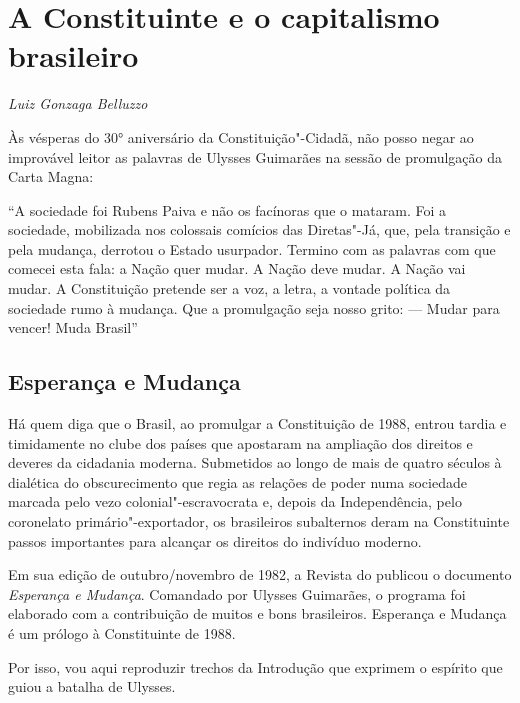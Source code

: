 \chapter*{A Constituinte e o capitalismo brasileiro}


\begin{flushright}
\emph{Luiz Gonzaga Belluzzo}
\end{flushright}

Às vésperas do 30° aniversário da Constituição"-Cidadã, não posso negar
ao improvável leitor as palavras de Ulysses Guimarães na sessão de
promulgação da Carta Magna:

``A sociedade foi Rubens Paiva e não os facínoras que o mataram. Foi a
sociedade, mobilizada nos colossais comícios das Diretas"-Já, que, pela
transição e pela mudança, derrotou o Estado usurpador. Termino com as
palavras com que comecei esta fala: a Nação quer mudar. A Nação deve
mudar. A Nação vai mudar. A Constituição pretende ser a voz, a letra, a
vontade política da sociedade rumo à mudança. Que a promulgação seja
nosso grito: --- Mudar para vencer! Muda Brasil''

\section{Esperança e Mudança}

Há quem diga que o Brasil, ao promulgar a Constituição de 1988, entrou
tardia e timidamente no clube dos países que apostaram na ampliação dos
direitos e deveres da cidadania moderna. Submetidos ao longo de mais de
quatro séculos à dialética do obscurecimento que regia as relações de
poder numa sociedade marcada pelo vezo colonial"-escravocrata e, depois
da Independência, pelo coronelato primário"-exportador, os brasileiros
subalternos deram na Constituinte passos importantes para alcançar os
direitos do indivíduo moderno.

Em sua edição de outubro/novembro de 1982, a Revista do  publicou o
documento \emph{Esperança e Mudança}. Comandado por Ulysses Guimarães, o
programa foi elaborado com a contribuição de muitos e bons brasileiros.
Esperança e Mudança é um prólogo à Constituinte de 1988.

Por isso, vou aqui reproduzir trechos da Introdução que exprimem o
espírito que guiou a batalha de Ulysses.

